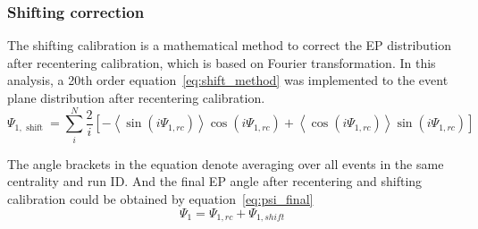 \subsubsection{Shifting correction}
The shifting calibration is a mathematical method to correct the EP distribution after recentering calibration,
which is based on Fourier transformation. In this analysis, a 20th order equation~\ref{eq:shift_method} was implemented to the event plane distribution
after recentering calibration.
\begin{equation}
\Psi_{1, \text { shift }}=\sum_i^N \frac{2}{i}\left[-\left\langle\sin \left(i \Psi_{1, r c}\right)\right\rangle \cos \left(i \Psi_{1, r c}\right)+\left\langle\cos \left(i \Psi_{1, r c}\right)\right\rangle \sin \left(i \Psi_{1, r c}\right)\right]
\label{eq:shift_method}
\end{equation}

The angle brackets in the equation denote averaging over all events in the same centrality and run ID.
And the final EP angle after recentering and shifting calibration could be obtained by equation~\ref{eq:psi_final}
\begin{equation}
\Psi_1=\Psi_{1, r c}+\Psi_{1, s h i f t}
\label{eq:psi_final}
\end{equation}

